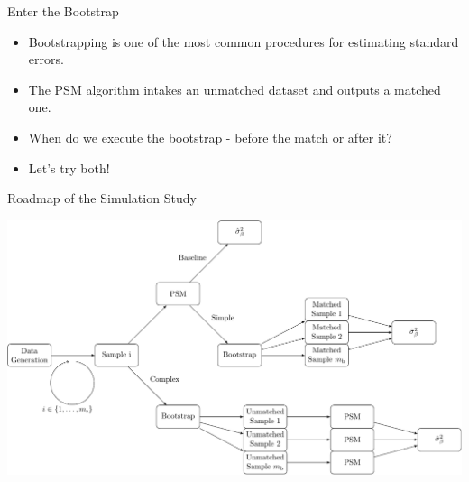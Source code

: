 \documentclass[
  ignorenonframetext,
]{beamer}
\providecommand{\tightlist}{%
  \setlength{\itemsep}{0pt}\setlength{\parskip}{0pt}}
\begin{document}
\begin{frame}{Enter the Bootstrap}
\protect\hypertarget{enter-the-bootstrap}{}

\begin{itemize}[<+->]
\tightlist
\item
  Bootstrapping is one of the most common procedures for estimating
  standard errors.
\end{itemize}

\begin{itemize}[<+->]
\tightlist
\item
  The PSM algorithm intakes an unmatched dataset and outputs a matched
  one.
\end{itemize}

\begin{itemize}[<+->]
\tightlist
\item
  When do we execute the bootstrap - before the match or after it?
\end{itemize}

\begin{itemize}[<+->]
\tightlist
\item
  Let's try both!
\end{itemize}

\end{frame}

\begin{frame}{Roadmap of the Simulation Study}
\protect\hypertarget{roadmap-of-the-simulation-study}{}

\includegraphics{pres_draft_jimmy_files/figure-beamer/unnamed-chunk-2-1.pdf}

\end{frame}
\end{document}
